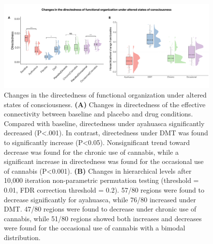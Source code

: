 \begin{figure}[h]
    \centering
    \includegraphics[width=\textwidth]{images/Figure 4_ Trophic coherence.png}
    \caption[Changes in directedness of hierarchical organization under altered state s of consciousness]{Changes in the directedness of functional organization under altered
states of consciousness. \textbf{(A)} Changes in directedness of the
effective connectivity between baseline and placebo and drug conditions.
Compared with baseline, directedness under ayahuasca significantly
decreased (P\textless.001). In contrast, directedness under DMT was
found to significantly increase (P\textless0.05). Nonsignificant trend
toward decrease was found for the chronic use of cannabis, while a
significant increase in directedness was found for the occasional use of
cannabis (P\textless0.001). \textbf{(B)} Changes in hierarchical levels
after 10,000 iteration non-parametric permutation testing (threshold =
0.01, FDR correction threshold = 0.2). 57/80 regions were found to
decrease significantly for ayahuasca, while 76/80 increased under DMT.
47/80 regions were found to decrease under chronic use of cannabis,
while 51/80 regions showed both increases and decreases were found for
the occasional use of cannabis with a bimodal distribution.}
    \label{fig:TC}
\end{figure}

